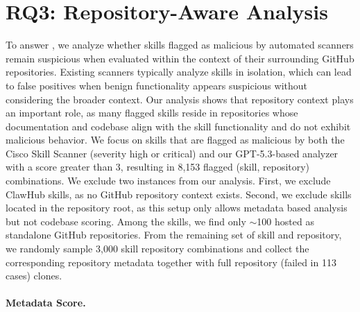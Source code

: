 \section{RQ3: Repository-Aware Analysis}

To answer , we analyze whether skills flagged as malicious by automated scanners remain suspicious when evaluated within the context of their surrounding GitHub repositories. Existing scanners typically analyze skills in isolation, which can lead to false positives when benign functionality appears suspicious without considering the broader context. 
Our analysis shows that repository context plays an important role, as many flagged skills reside in repositories whose documentation and codebase align with the skill functionality and do not exhibit malicious behavior. We focus on skills that are flagged as malicious by both the Cisco Skill Scanner (severity high or critical) and our GPT-5.3-based analyzer with a score greater than 3, resulting in 8,153 flagged (skill, repository) combinations. We exclude two instances from our analysis. First, we exclude ClawHub skills, as no GitHub repository context exists. Second, we exclude skills located in the repository root, as this setup only allows metadata based analysis but not codebase scoring. Among the skills, we find only $\sim$100 hosted as standalone GitHub repositories.  From the remaining set of skill and repository, we randomly sample 3,000 skill repository combinations and collect the corresponding repository metadata together with full repository (failed in 113 cases) clones.


\paragraph{Metadata Score.}

